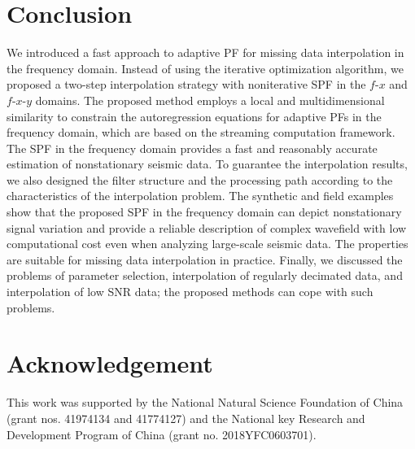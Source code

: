 \section{Conclusion}

We introduced a fast approach to adaptive PF for missing data
interpolation in the frequency domain.  Instead of using the iterative
optimization algorithm, we proposed a two-step interpolation strategy
with noniterative SPF in the $f$-$x$ and $f$-$x$-$y$ domains.  The
proposed method employs a local and multidimensional similarity to
constrain the autoregression equations for adaptive PFs in the
frequency domain, which are based on the streaming computation
framework. The SPF in the frequency domain provides a fast and
reasonably accurate estimation of nonstationary seismic data.  To
guarantee the interpolation results, we also designed the filter
structure and the processing path according to the characteristics of
the interpolation problem. The synthetic and field examples show that
the proposed SPF in the frequency domain can depict nonstationary
signal variation and provide a reliable description of complex
wavefield with low computational cost even when analyzing large-scale
seismic data. The properties are suitable for missing data
interpolation in practice. Finally, we discussed the problems of
parameter selection, interpolation of regularly decimated data, and
interpolation of low SNR data; the proposed methods can cope with such
problems.

\section{Acknowledgement}
This work was supported by the National Natural Science Foundation of
China (grant nos. 41974134 and 41774127) and the National key Research
and Development Program of China (grant no. 2018YFC0603701).




